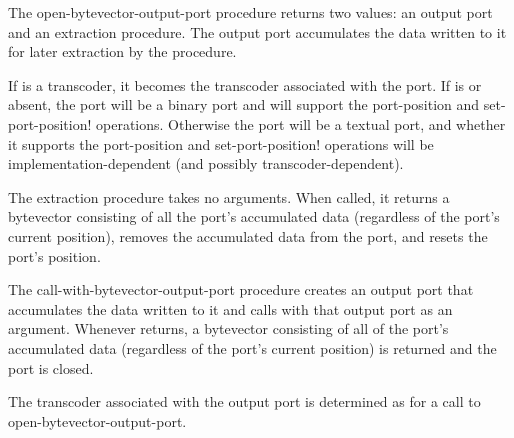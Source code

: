 \begin{entry}{%
}


The {\cf open-bytevector-output-port} procedure returns 
two values: an output port and an extraction procedure.
The output port accumulates the data written to it for
later extraction by the procedure.

If  is a transcoder, it becomes
the transcoder associated with the port.
If  is \schfalse{} or absent,
the port will be a binary port and will support the
{\cf port-position} and {\cf set-port-position!}  operations.
Otherwise the port will be a textual port, and whether it supports
the {\cf port-position} and {\cf set-port-position!} operations
will be implementation-dependent (and possibly transcoder-dependent).

The extraction procedure takes no arguments.
When called, it returns a
bytevector consisting of all the port's accumulated data (regardless
of the port's current position), removes
the accumulated data from the port, and resets the port's position.
\end{entry}

\begin{entry}{%
}


The {\cf call-with-bytevector-output-port} procedure creates an output
port that accumulates the data written to it and calls  with
that output port as an argument. Whenever  returns, a
bytevector consisting of all of the port's accumulated data (regardless
of the port's current position) is returned and
the port is closed.

The transcoder associated with the output port is determined
as for a call to {\cf open-bytevector-output-port}.
\end{entry}

